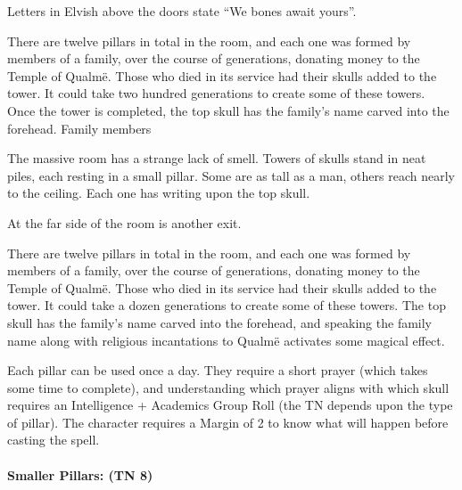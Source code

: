 \begin{multicols}{2}


\begin{boxtext}
  Letters in Elvish above the doors state ``We bones await yours''.
\end{boxtext}

There are twelve pillars in total in the room, and each one was formed by members of a family, over the course of generations, donating money to the Temple of Qualm\"{e}.  Those who died in its service had their skulls added to the tower.  It could take two hundred generations to create some of these towers.  Once the tower is completed, the top skull has the family's name carved into the forehead.  Family members

\begin{boxtext}

  The massive room has a strange lack of smell.  Towers of skulls stand in neat piles, each resting in a small pillar.  Some are as tall as a man, others reach nearly to the ceiling.  Each one has writing upon the top skull.

  At the far side of the room is another exit.

\end{boxtext}

There are twelve pillars in total in the room, and each one was formed by members of a family, over the course of generations, donating money to the Temple of Qualm\"{e}.
Those who died in its service had their skulls added to the tower.
It could take a dozen generations to create some of these towers.
The top skull has the family's name carved into the forehead, and speaking the family name along with religious incantations to Qualm\"{e} activates some magical effect.

Each pillar can be used once a day.
They require a short prayer (which takes some time to complete), and understanding which prayer aligns with which skull requires an Intelligence + Academics Group Roll (the TN depends upon the type of pillar).
The character requires a Margin of 2 to know what will happen before casting the spell.

\paragraph{Smaller Pillars: (TN 8)}

\begin{enumerate}


\end{enumerate}
\end{multicols}
